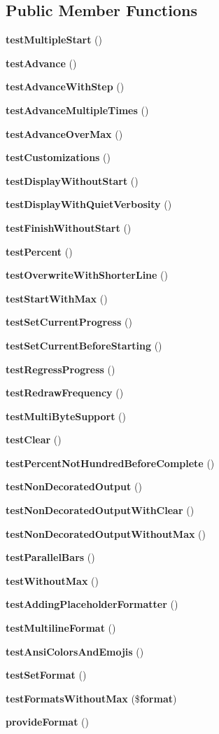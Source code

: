 \subsection*{Public Member Functions}
\begin{DoxyCompactItemize}
\item 
{\bf test\+Multiple\+Start} ()
\item 
{\bf test\+Advance} ()
\item 
{\bf test\+Advance\+With\+Step} ()
\item 
{\bf test\+Advance\+Multiple\+Times} ()
\item 
{\bf test\+Advance\+Over\+Max} ()
\item 
{\bf test\+Customizations} ()
\item 
{\bf test\+Display\+Without\+Start} ()
\item 
{\bf test\+Display\+With\+Quiet\+Verbosity} ()
\item 
{\bf test\+Finish\+Without\+Start} ()
\item 
{\bf test\+Percent} ()
\item 
{\bf test\+Overwrite\+With\+Shorter\+Line} ()
\item 
{\bf test\+Start\+With\+Max} ()
\item 
{\bf test\+Set\+Current\+Progress} ()
\item 
{\bf test\+Set\+Current\+Before\+Starting} ()
\item 
{\bf test\+Regress\+Progress} ()
\item 
{\bf test\+Redraw\+Frequency} ()
\item 
{\bf test\+Multi\+Byte\+Support} ()
\item 
{\bf test\+Clear} ()
\item 
{\bf test\+Percent\+Not\+Hundred\+Before\+Complete} ()
\item 
{\bf test\+Non\+Decorated\+Output} ()
\item 
{\bf test\+Non\+Decorated\+Output\+With\+Clear} ()
\item 
{\bf test\+Non\+Decorated\+Output\+Without\+Max} ()
\item 
{\bf test\+Parallel\+Bars} ()
\item 
{\bf test\+Without\+Max} ()
\item 
{\bf test\+Adding\+Placeholder\+Formatter} ()
\item 
{\bf test\+Multiline\+Format} ()
\item 
{\bf test\+Ansi\+Colors\+And\+Emojis} ()
\item 
{\bf test\+Set\+Format} ()
\item 
{\bf test\+Formats\+Without\+Max} (\${\bf format})
\item 
{\bf provide\+Format} ()
\end{DoxyCompactItemize}
